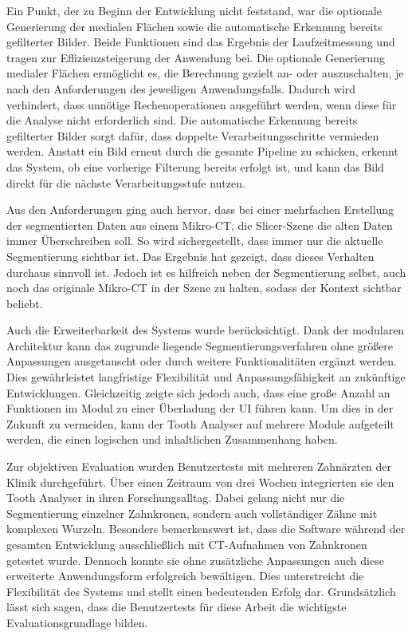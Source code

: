 Ein Punkt, der zu Beginn der Entwicklung nicht feststand, war die optionale Generierung
der medialen Flächen sowie die automatische Erkennung bereits gefilterter Bilder.
Beide Funktionen sind das Ergebnis der Laufzeitmessung und tragen zur
Effizienzsteigerung der Anwendung bei. Die optionale Generierung medialer Flächen
ermöglicht es, die Berechnung gezielt an- oder auszuschalten, je nach den
Anforderungen des jeweiligen Anwendungsfalls. Dadurch wird verhindert, dass
unnötige Rechenoperationen ausgeführt werden, wenn diese für die Analyse nicht erforderlich
sind. Die automatische Erkennung bereits gefilterter Bilder sorgt dafür, dass doppelte
Verarbeitungsschritte vermieden werden. Anstatt ein Bild erneut durch die
gesamte Pipeline zu schicken, erkennt das System, ob eine vorherige Filterung
bereits erfolgt ist, und kann das Bild direkt für die nächste Verarbeitungsstufe
nutzen.

Aus den Anforderungen ging auch hervor, dass bei einer mehrfachen Erstellung der
segmentierten Daten aus einem Mikro-\ac{CT}, die Slicer-Szene die alten Daten
immer Überschreiben soll. So wird sichergestellt, dass immer nur die aktuelle
Segmentierung sichtbar ist. Das Ergebnis hat gezeigt, dass dieses Verhalten
durchaus sinnvoll ist. Jedoch ist es hilfreich neben der Segmentierung selbst,
auch noch das originale Mikro-\ac{CT} in der Szene zu halten, sodass der Kontext
sichtbar beliebt.

Auch die Erweiterbarkeit des Systems wurde berücksichtigt. Dank der modularen Architektur
kann das zugrunde liegende Segmentierungsverfahren ohne größere Anpassungen ausgetauscht
oder durch weitere Funktionalitäten ergänzt werden. Dies gewährleistet
langfristige Flexibilität und Anpassungsfähigkeit an zukünftige Entwicklungen. Gleichzeitig
zeigte sich jedoch auch, dass eine große Anzahl an Funktionen im Modul zu einer
Überladung der \ac{UI} führen kann. Um dies in der Zukunft zu vermeiden, kann der
Tooth Analyser auf mehrere Module aufgeteilt werden, die einen logischen und
inhaltlichen Zusammenhang haben.

Zur objektiven Evaluation wurden Benutzertests mit mehreren Zahnärzten der
Klinik durchgeführt. Über einen Zeitraum von drei Wochen integrierten sie den Tooth
Analyser in ihren Forschungsalltag. Dabei gelang nicht nur die Segmentierung
einzelner Zahnkronen, sondern auch vollständiger Zähne mit komplexen Wurzeln.
Besonders bemerkenswert ist, dass die Software während der gesamten Entwicklung ausschließlich
mit \ac{CT}-Aufnahmen von Zahnkronen getestet wurde. Dennoch konnte sie ohne zusätzliche
Anpassungen auch diese erweiterte Anwendungsform erfolgreich bewältigen. Dies
unterstreicht die Flexibilität des Systems und stellt einen bedeutenden Erfolg
dar. Grundsätzlich lässt sich sagen, dass die Benutzertests für diese Arbeit die
wichtigste Evaluationsgrundlage bilden.

